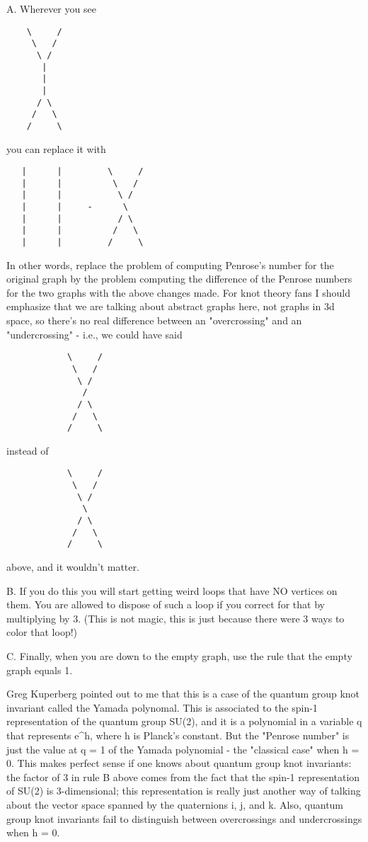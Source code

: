 A.  Wherever you see

\begin{verbatim}
    \     /
     \   /
      \ /
       |
       |
       |
      / \
     /   \
    /     \
\end{verbatim}
    

you can replace it with

\begin{verbatim}
   |      |         \     /
   |      |          \   /
   |      |           \ /
   |      |     -      \ 
   |      |           / \
   |      |          /   \
   |      |         /     \
\end{verbatim}
    

In other words, replace the problem of computing Penrose's number for
the original graph by the problem computing the difference of the
Penrose numbers for the two graphs with the above changes made.  For
knot theory fans I should emphasize that we are talking about abstract
graphs here, not graphs in 3d space, so there's no real difference
between an "overcrossing" and an "undercrossing" - i.e., we could have
said

\begin{verbatim}
            \     /
             \   /
              \ /
               / 
              / \
             /   \
            /     \
\end{verbatim}
    

instead of

\begin{verbatim}
            \     /
             \   /
              \ /
               \ 
              / \
             /   \
            /     \
\end{verbatim}
    

above, and it wouldn't matter.

B.  If you do this you will start getting weird loops that have NO
vertices on them.  You are allowed to dispose of such a loop if you
correct for that by multiplying by 3.  (This is not magic, this is just
because there were 3 ways to color that loop!)

C.  Finally, when you are down to the empty graph, use the rule that the
empty graph equals 1. 

Greg Kuperberg pointed out to me that this is a case of the quantum group knot
invariant called the Yamada polynomal.  This is associated to the spin-1
representation of the quantum group SU(2), and it is a polynomial in a
variable q that represents e^h, where h is Planck's constant.
But the "Penrose number" is just the value at q = 1 of the Yamada
polynomial - the "classical case" when h = 0.  This makes perfect
sense if one knows about quantum group knot invariants: the factor of 3
in rule B above comes from the fact that the spin-1 representation of
SU(2) is 3-dimensional; this representation is really just another way
of talking about the vector space spanned by the quaternions i, j, and
k.  Also, quantum group knot invariants fail to distinguish between
overcrossings and undercrossings when h = 0.

